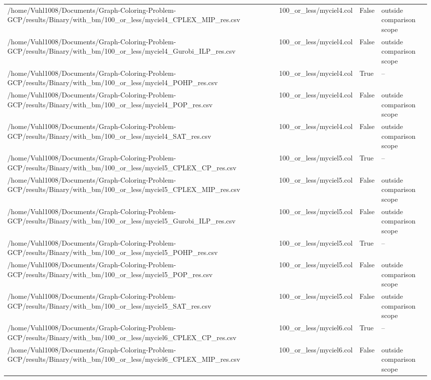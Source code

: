 \begin{table}[htbp]
\begin{tabular}{llll}
/home/Vuhl1008/Documents/Graph-Coloring-Problem-GCP/results/Binary/with\_bm/100\_or\_less/myciel4\_CPLEX\_MIP\_res.csv & 100\_or\_less/myciel4.col & False & outside comparison scope \\
/home/Vuhl1008/Documents/Graph-Coloring-Problem-GCP/results/Binary/with\_bm/100\_or\_less/myciel4\_Gurobi\_ILP\_res.csv & 100\_or\_less/myciel4.col & False & outside comparison scope \\
/home/Vuhl1008/Documents/Graph-Coloring-Problem-GCP/results/Binary/with\_bm/100\_or\_less/myciel4\_POHP\_res.csv & 100\_or\_less/myciel4.col & True & -- \\
/home/Vuhl1008/Documents/Graph-Coloring-Problem-GCP/results/Binary/with\_bm/100\_or\_less/myciel4\_POP\_res.csv & 100\_or\_less/myciel4.col & False & outside comparison scope \\
/home/Vuhl1008/Documents/Graph-Coloring-Problem-GCP/results/Binary/with\_bm/100\_or\_less/myciel4\_SAT\_res.csv & 100\_or\_less/myciel4.col & False & outside comparison scope \\
/home/Vuhl1008/Documents/Graph-Coloring-Problem-GCP/results/Binary/with\_bm/100\_or\_less/myciel5\_CPLEX\_CP\_res.csv & 100\_or\_less/myciel5.col & True & -- \\
/home/Vuhl1008/Documents/Graph-Coloring-Problem-GCP/results/Binary/with\_bm/100\_or\_less/myciel5\_CPLEX\_MIP\_res.csv & 100\_or\_less/myciel5.col & False & outside comparison scope \\
/home/Vuhl1008/Documents/Graph-Coloring-Problem-GCP/results/Binary/with\_bm/100\_or\_less/myciel5\_Gurobi\_ILP\_res.csv & 100\_or\_less/myciel5.col & False & outside comparison scope \\
/home/Vuhl1008/Documents/Graph-Coloring-Problem-GCP/results/Binary/with\_bm/100\_or\_less/myciel5\_POHP\_res.csv & 100\_or\_less/myciel5.col & True & -- \\
/home/Vuhl1008/Documents/Graph-Coloring-Problem-GCP/results/Binary/with\_bm/100\_or\_less/myciel5\_POP\_res.csv & 100\_or\_less/myciel5.col & False & outside comparison scope \\
/home/Vuhl1008/Documents/Graph-Coloring-Problem-GCP/results/Binary/with\_bm/100\_or\_less/myciel5\_SAT\_res.csv & 100\_or\_less/myciel5.col & False & outside comparison scope \\
/home/Vuhl1008/Documents/Graph-Coloring-Problem-GCP/results/Binary/with\_bm/100\_or\_less/myciel6\_CPLEX\_CP\_res.csv & 100\_or\_less/myciel6.col & True & -- \\
/home/Vuhl1008/Documents/Graph-Coloring-Problem-GCP/results/Binary/with\_bm/100\_or\_less/myciel6\_CPLEX\_MIP\_res.csv & 100\_or\_less/myciel6.col & False & outside comparison scope \\

\end{tabular}
\end{table}
